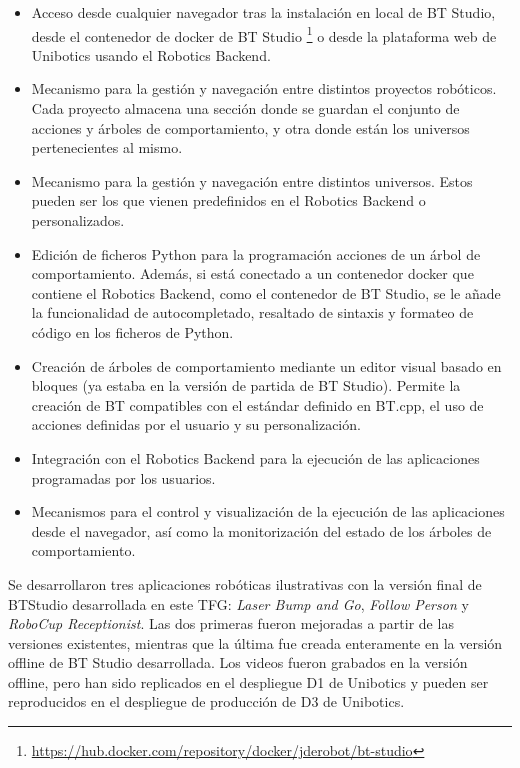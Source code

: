 \begin{itemize}

    \item Acceso desde cualquier navegador tras la instalación en local de BT Studio, desde el contenedor de docker de BT Studio \footnote{\url{https://hub.docker.com/repository/docker/jderobot/bt-studio}} o desde la plataforma web de Unibotics usando el Robotics Backend. 

    \item Mecanismo para la gestión y navegación entre distintos proyectos robóticos. Cada proyecto almacena una sección donde se guardan el conjunto de acciones y árboles de comportamiento, y otra donde están los universos pertenecientes al mismo. 

    \item Mecanismo para la gestión y navegación entre distintos universos. Estos pueden ser los que vienen predefinidos en el Robotics Backend o personalizados. 
    
    \item Edición de ficheros Python para la programación acciones de un árbol de comportamiento. Además, si está conectado a un contenedor docker que contiene el Robotics Backend, como el contenedor de BT Studio, se le añade la funcionalidad de autocompletado, resaltado de sintaxis y formateo de  código en los ficheros de Python. 

    \item Creación de árboles de comportamiento mediante un editor visual basado en bloques (ya estaba en la versión de partida de BT Studio). Permite la creación de BT compatibles con el estándar definido en BT.cpp, el uso de acciones definidas por el usuario y su personalización.

    \item Integración con el Robotics Backend para la ejecución de las aplicaciones programadas por los usuarios. 
    
    \item Mecanismos para el control y visualización de la ejecución de las aplicaciones desde el navegador, así como la monitorización del estado de los árboles de comportamiento. 
    
\end{itemize}

Se desarrollaron tres aplicaciones robóticas ilustrativas con la versión final de BTStudio
desarrollada en este TFG: \textit{Laser Bump and Go}, \textit{Follow Person} y \textit{RoboCup Receptionist}. Las dos primeras fueron mejoradas a partir de las versiones existentes, mientras que la última fue creada enteramente en la versión offline de BT Studio desarrollada. Los videos fueron grabados en la versión offline, pero han sido replicados en el despliegue D1 de Unibotics y pueden ser reproducidos en el despliegue de producción de D3 de Unibotics.

